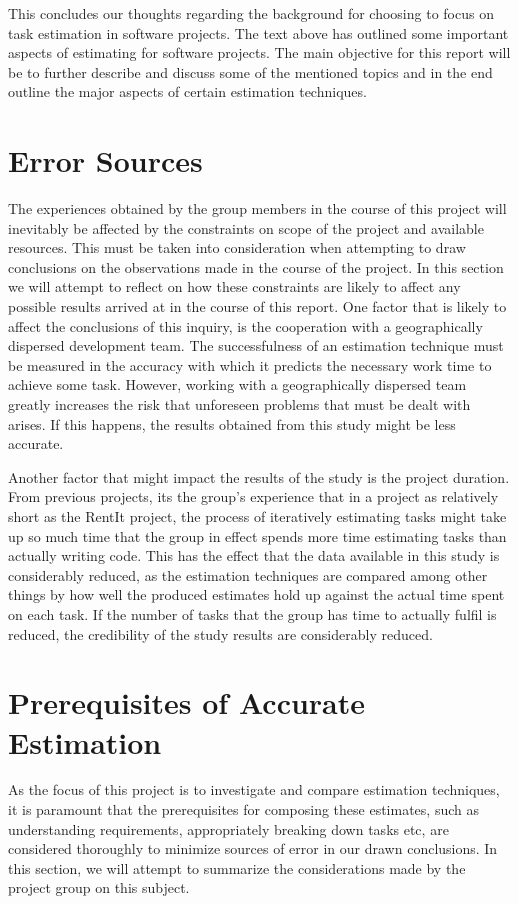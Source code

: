 This concludes our thoughts regarding the background for choosing to focus on task estimation in software projects. The text above has outlined some important aspects of estimating for software projects. The main objective for this report will be to further describe and discuss some of the mentioned topics and in the end outline the major aspects of certain estimation techniques.

\section{Error Sources}
The experiences obtained by the group members in the course of this project will inevitably be affected by the constraints on scope of the project and available resources. This must be taken into consideration when attempting to draw conclusions on the observations made in the course of the project. In this section we will attempt to reflect on how these constraints are likely to affect any possible results arrived at in the course of this report.
One factor that is likely to affect the conclusions of this inquiry, is the cooperation with a geographically dispersed development team. The successfulness of an estimation technique must be measured in the accuracy with which it predicts the necessary work time to achieve some task. However, working with a geographically dispersed team greatly increases the risk that unforeseen problems that must be dealt with arises. If this happens, the results obtained from this study might be less accurate.

Another factor that might impact the results of the study is the project duration. From previous projects, its the group's experience that in a project as relatively short as the RentIt project, the process of iteratively estimating tasks might take up so much time that the group in effect spends more time estimating tasks than actually writing code. This has the effect that the data available in this study is considerably reduced, as the estimation techniques are compared among other things by how well the produced estimates hold up against the actual time spent on each task. If the number of tasks that the group has time to actually fulfil is reduced, the credibility of the study results are considerably reduced.

\section{Prerequisites of Accurate Estimation}
As the focus of this project is to investigate and compare estimation techniques, it is paramount that the prerequisites for composing these estimates, such as understanding requirements, appropriately breaking down tasks etc, are considered thoroughly to minimize sources of error in our drawn conclusions. In this section, we will attempt to summarize the considerations made by the project group on this subject.

